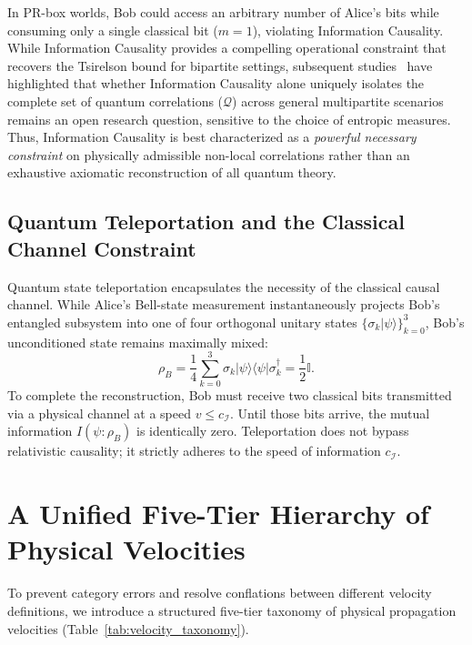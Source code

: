 \documentclass[11pt,a4paper]{article}
\begin{document}
In PR-box worlds, Bob could access an arbitrary number of Alice's bits while consuming only a single classical bit ($m = 1$), violating Information Causality. While Information Causality provides a compelling operational constraint that recovers the Tsirelson bound for bipartite settings, subsequent studies~\cite{chiribella2011} have highlighted that whether Information Causality alone uniquely isolates the complete set of quantum correlations ($\mathcal{Q}$) across general multipartite scenarios remains an open research question, sensitive to the choice of entropic measures. Thus, Information Causality is best characterized as a \emph{powerful necessary constraint} on physically admissible non-local correlations rather than an exhaustive axiomatic reconstruction of all quantum theory.

\subsection{Quantum Teleportation and the Classical Channel Constraint}

Quantum state teleportation encapsulates the necessity of the classical causal channel. While Alice's Bell-state measurement instantaneously projects Bob's entangled subsystem into one of four orthogonal unitary states $\{\sigma_k |\psi\rangle\}_{k=0}^3$, Bob's unconditioned state remains maximally mixed:
\begin{equation}
\rho_B = \frac{1}{4} \sum_{k=0}^3 \sigma_k |\psi\rangle\langle\psi| \sigma_k^\dagger = \frac{1}{2} \mathbb{I}.
\end{equation}
To complete the reconstruction, Bob must receive two classical bits transmitted via a physical channel at a speed $v \le c_{\mathcal{I}}$. Until those bits arrive, the mutual information $I(\psi : \rho_B)$ is identically zero. Teleportation does not bypass relativistic causality; it strictly adheres to the speed of information $c_{\mathcal{I}}$.

\section{A Unified Five-Tier Hierarchy of Physical Velocities}

To prevent category errors and resolve conflations between different velocity definitions, we introduce a structured five-tier taxonomy of physical propagation velocities (Table~\ref{tab:velocity_taxonomy}).
\end{document}
